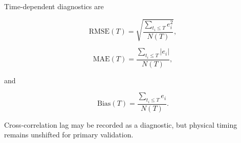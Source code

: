 Time-dependent diagnostics are

\begin{equation}
\label{eq:validation-rmse-time}
\mathrm{RMSE}(T)
=
\sqrt{
\frac{
\sum_{t_i\le T}e_i^2
}{
N(T)
}
},
\end{equation}

\begin{equation}
\label{eq:validation-mae-time}
\mathrm{MAE}(T)
=
\frac{
\sum_{t_i\le T}|e_i|
}{
N(T)
},
\end{equation}

and

\begin{equation}
\label{eq:validation-bias-time}
\mathrm{Bias}(T)
=
\frac{
\sum_{t_i\le T}e_i
}{
N(T)
}.
\end{equation}

Cross-correlation lag may be recorded as a diagnostic, but physical timing remains unshifted for primary validation.
